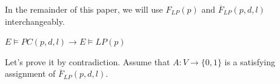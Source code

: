 \documentclass[journal]{IEEEtran}
\begin{document}
In the remainder of this paper,
we will use $F_{LP}(p)$ and $\overline{F}_{LP}(p,d,l)$ interchangeably.

\begin{theorem}\label{R1}
$E\vDash PC(p,d,l)\to E\vDash LP(p)$
\end{theorem}
\begin{IEEEproof}
Let's prove it by contradiction.
Assume that $A:V\to \{0,1\}$ is a satisfying assignment of $\overline{F}_{LP}(p,d,l)$.

%
%
%
%

\end{IEEEproof}
\end{document}
